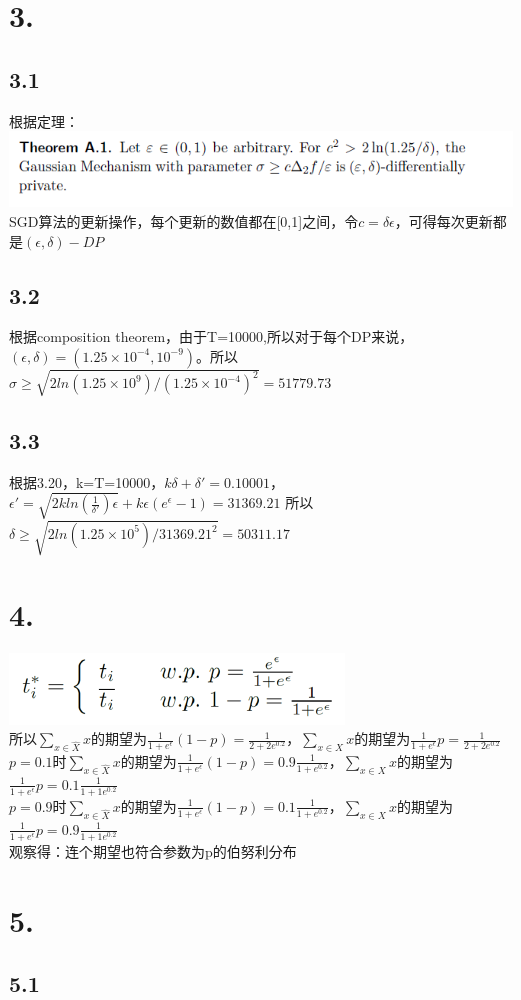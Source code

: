 \documentclass{article}
\begin{document}
	\section*{3.}
	\subsection*{3.1}
	根据定理：\\
	\includegraphics*[scale = 0.6]{3.png}\\
	SGD算法的更新操作，每个更新的数值都在[0,1]之间，令$c=\delta \epsilon$，可得每次更新都是$(\epsilon,\delta)-DP$
	\subsection*{3.2}
	根据composition theorem，由于T=10000,所以对于每个DP来说，$(\epsilon,\delta)=(1.25\times 10^{-4},10^{-9})$。所以$\sigma \ge \sqrt{2ln(1.25\times 10^{9})/(1.25\times 10^{-4})^{2}}=51779.73$
	\subsection*{3.3}
	根据3.20，k=T=10000，$k\delta+\delta'= 0.10001$，$\epsilon'=\sqrt{2kln(\frac{1}{\delta'})\epsilon}+k\epsilon(e^{\epsilon}-1)=31369.21$
	所以$\delta \ge \sqrt{2ln(1.25\times 10^{5})/31369.21^{2}}=50311.17$
	\section*{4.}
	\includegraphics*[scale = 0.8]{4.png}\\
	所以$\sum_{x\in \hat{X}}x$的期望为$\frac{1}{1+e^{\epsilon}}(1-p)=\frac{1}{2+2e^{0.2}}$，$\sum_{x\in X}x$的期望为$\frac{1}{1+e^{\epsilon}}p=\frac{1}{2+2e^{0.2}}$\\
	$p=0.1$时$\sum_{x\in \hat{X}}x$的期望为$\frac{1}{1+e^{\epsilon}}(1-p)=0.9\frac{1}{1+e^{0.2}}$，$\sum_{x\in X}x$的期望为$\frac{1}{1+e^{\epsilon}}p=0.1\frac{1}{1+1e^{0.2}}$\\
	$p=0.9$时$\sum_{x\in \hat{X}}x$的期望为$\frac{1}{1+e^{\epsilon}}(1-p)=0.1\frac{1}{1+e^{0.2}}$，$\sum_{x\in X}x$的期望为$\frac{1}{1+e^{\epsilon}}p=0.9\frac{1}{1+1e^{0.2}}$\\
	观察得：连个期望也符合参数为p的伯努利分布
	\section*{5.}
	\subsection*{5.1}
	
\end{document}
